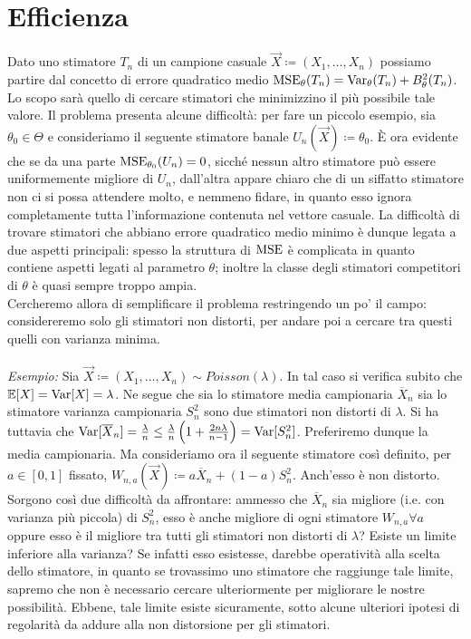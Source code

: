 \section{Efficienza}
Dato uno stimatore $T_n$ di un campione casuale $\vec{X}\coloneqq (X_1,\ldots,X_n)$ possiamo partire dal concetto di errore quadratico medio $\operatorname{MSE}_\theta(T_n)=\operatorname{Var}_\theta(T_n)+B_\theta^2(T_n)$. Lo scopo sarà quello di cercare stimatori che minimizzino il più possibile tale valore. Il problema presenta alcune difficoltà: per fare un piccolo esempio, sia $\theta_0\in \Theta$ e consideriamo il seguente stimatore banale $U_n(\vec{X})\coloneqq \theta_0$. È ora evidente che se da una parte $\operatorname{MSE}_{\theta_0}(U_n)=0$, sicché nessun altro stimatore può essere uniformemente migliore di $U_n$, dall'altra appare chiaro che di un siffatto stimatore non ci si possa attendere molto, e nemmeno fidare, in quanto esso ignora completamente tutta l'informazione contenuta nel vettore casuale. La difficoltà di trovare stimatori che abbiano errore quadratico medio minimo è dunque legata a due aspetti principali: spesso la struttura di $\operatorname{MSE}$ è complicata in quanto contiene aspetti legati al parametro $\theta$; inoltre la classe degli stimatori competitori di $\theta$ è quasi sempre troppo ampia. \\ Cercheremo allora di semplificare il problema restringendo un po' il campo: considereremo solo gli stimatori non distorti, per andare poi a cercare tra questi quelli con varianza minima.  
\\
\\
\textit{Esempio:} Sia $\vec{X}\coloneqq (X_1,\ldots,X_n)\sim Poisson(\lambda)$. In tal caso si verifica subito che $\mathbb{E}[X]=\operatorname{Var}[X]=\lambda$. Ne segue che sia lo stimatore media campionaria $\overline{X}_n$ sia lo stimatore varianza campionaria $S_n^2$ sono due stimatori non distorti di $\lambda$. Si ha tuttavia che $\operatorname{Var}[\overline{X}_n]=\frac{\lambda}{n}\leq\frac{\lambda}{n}\left(1+\frac{2n\lambda}{n-1}\right)=\operatorname{Var}[S_n^2]$. Preferiremo dunque la media campionaria. Ma consideriamo ora il seguente stimatore così definito, per $a\in [0,1]$ fissato, $W_{n,a}(\vec{X})\coloneqq a\overline{X}_n +(1-a)S_n^2$. Anch'esso è non distorto. Sorgono così due difficoltà da affrontare: ammesso che $\overline{X}_n$ sia migliore (i.e. con varianza più piccola) di $S_n^2$, esso è anche migliore di ogni stimatore $W_{n,a} \forall a$ oppure esso è il migliore tra tutti gli stimatori non distorti di $\lambda$? Esiste un limite inferiore alla varianza? Se infatti esso esistesse, darebbe operatività alla scelta dello stimatore, in quanto se trovassimo uno stimatore che raggiunge tale limite, sapremo che non è necessario cercare ulteriormente per migliorare le nostre possibilità. Ebbene, tale limite esiste sicuramente, sotto alcune ulteriori ipotesi di regolarità da addure alla non distorsione per gli stimatori.
